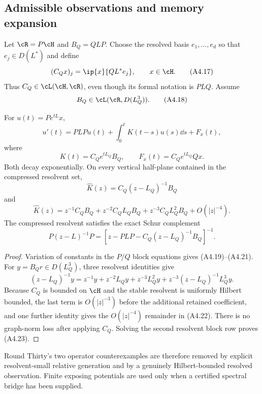 \subsection{Admissible observations and memory expansion}

Let $\cR=P\cH$ and $B_Q=QLP$.  Choose the resolved basis
$e_1,\ldots,e_d$ so that $e_j\in D(L^*)$ and define
\[
 (C_Qx)_j=\ip{x}{Q L^*e_j},\qquad x\in\cH.                \tag{A4.17}
\]
Thus $C_Q\in\cL(\cH,\cR)$, even though its formal notation is $PLQ$.
Assume
\[
 B_Q\in\cL(\cR,D(L_Q^3)).                                 \tag{A4.18}
\]

\begin{theorem}
\label{thm:r31-a4-memory}
For $u(t)=Pe^{tL}x$,
\[
 u'(t)=PLPu(t)+\int_0^tK(t-s)u(s)\dd s+F_x(t),            \tag{A4.19}
\]
where
\[
 K(t)=C_Qe^{tL_Q}B_Q,\qquad F_x(t)=C_Qe^{tL_Q}Qx.          \tag{A4.20}
\]
Both decay exponentially.  On every vertical half-plane contained in the
compressed resolvent set,
\[
 \widehat K(z)=C_Q(z-L_Q)^{-1}B_Q                         \tag{A4.21}
\]
and
\[
 \widehat K(z)=z^{-1}C_QB_Q+z^{-2}C_QL_QB_Q
               +z^{-3}C_QL_Q^2B_Q+O(|z|^{-4}).           \tag{A4.22}
\]
The compressed resolvent satisfies the exact Schur complement
\[
 P(z-L)^{-1}P=
 [z-PLP-C_Q(z-L_Q)^{-1}B_Q]^{-1}.                         \tag{A4.23}
\]
\end{theorem}

\begin{proof}
Variation of constants in the $P/Q$ block equations gives
(A4.19)--(A4.21).  For $y=B_Qr\in D(L_Q^3)$, three resolvent identities give
\[
 (z-L_Q)^{-1}y=z^{-1}y+z^{-2}L_Qy+z^{-3}L_Q^2y
 +z^{-3}(z-L_Q)^{-1}L_Q^3y.
\]
Because $C_Q$ is bounded on $\cH$ and the stable resolvent is uniformly
Hilbert bounded, the last term is $O(|z|^{-3})$ before the additional retained
coefficient, and one further identity gives the $O(|z|^{-4})$ remainder in
(A4.22).  There is no graph-norm loss after applying $C_Q$.  Solving the
second resolvent block row proves (A4.23).
\end{proof}

Round Thirty's two operator counterexamples are therefore removed by explicit
resolvent-small relative generation and by a genuinely Hilbert-bounded
resolved observation.  Finite exposing potentials are used only when a
certified spectral bridge has been supplied.
